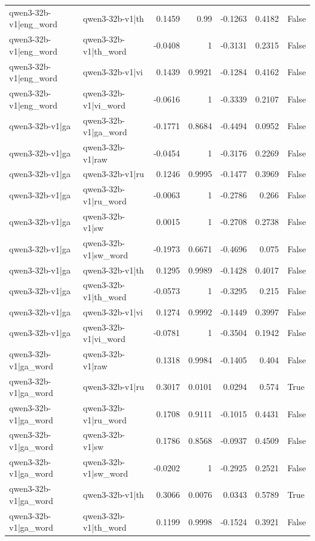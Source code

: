 \begin{table}
\begin{tabular}{l l r r r r l}
qwen3-32b-v1|eng_word & qwen3-32b-v1|th & 0.1459 & 0.99 & -0.1263 & 0.4182 & False \\
qwen3-32b-v1|eng_word & qwen3-32b-v1|th_word & -0.0408 & 1 & -0.3131 & 0.2315 & False \\
qwen3-32b-v1|eng_word & qwen3-32b-v1|vi & 0.1439 & 0.9921 & -0.1284 & 0.4162 & False \\
qwen3-32b-v1|eng_word & qwen3-32b-v1|vi_word & -0.0616 & 1 & -0.3339 & 0.2107 & False \\
qwen3-32b-v1|ga & qwen3-32b-v1|ga_word & -0.1771 & 0.8684 & -0.4494 & 0.0952 & False \\
qwen3-32b-v1|ga & qwen3-32b-v1|raw & -0.0454 & 1 & -0.3176 & 0.2269 & False \\
qwen3-32b-v1|ga & qwen3-32b-v1|ru & 0.1246 & 0.9995 & -0.1477 & 0.3969 & False \\
qwen3-32b-v1|ga & qwen3-32b-v1|ru_word & -0.0063 & 1 & -0.2786 & 0.266 & False \\
qwen3-32b-v1|ga & qwen3-32b-v1|sw & 0.0015 & 1 & -0.2708 & 0.2738 & False \\
qwen3-32b-v1|ga & qwen3-32b-v1|sw_word & -0.1973 & 0.6671 & -0.4696 & 0.075 & False \\
qwen3-32b-v1|ga & qwen3-32b-v1|th & 0.1295 & 0.9989 & -0.1428 & 0.4017 & False \\
qwen3-32b-v1|ga & qwen3-32b-v1|th_word & -0.0573 & 1 & -0.3295 & 0.215 & False \\
qwen3-32b-v1|ga & qwen3-32b-v1|vi & 0.1274 & 0.9992 & -0.1449 & 0.3997 & False \\
qwen3-32b-v1|ga & qwen3-32b-v1|vi_word & -0.0781 & 1 & -0.3504 & 0.1942 & False \\
qwen3-32b-v1|ga_word & qwen3-32b-v1|raw & 0.1318 & 0.9984 & -0.1405 & 0.404 & False \\
qwen3-32b-v1|ga_word & qwen3-32b-v1|ru & 0.3017 & 0.0101 & 0.0294 & 0.574 & True \\
qwen3-32b-v1|ga_word & qwen3-32b-v1|ru_word & 0.1708 & 0.9111 & -0.1015 & 0.4431 & False \\
qwen3-32b-v1|ga_word & qwen3-32b-v1|sw & 0.1786 & 0.8568 & -0.0937 & 0.4509 & False \\
qwen3-32b-v1|ga_word & qwen3-32b-v1|sw_word & -0.0202 & 1 & -0.2925 & 0.2521 & False \\
qwen3-32b-v1|ga_word & qwen3-32b-v1|th & 0.3066 & 0.0076 & 0.0343 & 0.5789 & True \\
qwen3-32b-v1|ga_word & qwen3-32b-v1|th_word & 0.1199 & 0.9998 & -0.1524 & 0.3921 & False \\

\end{tabular}
\end{table}
